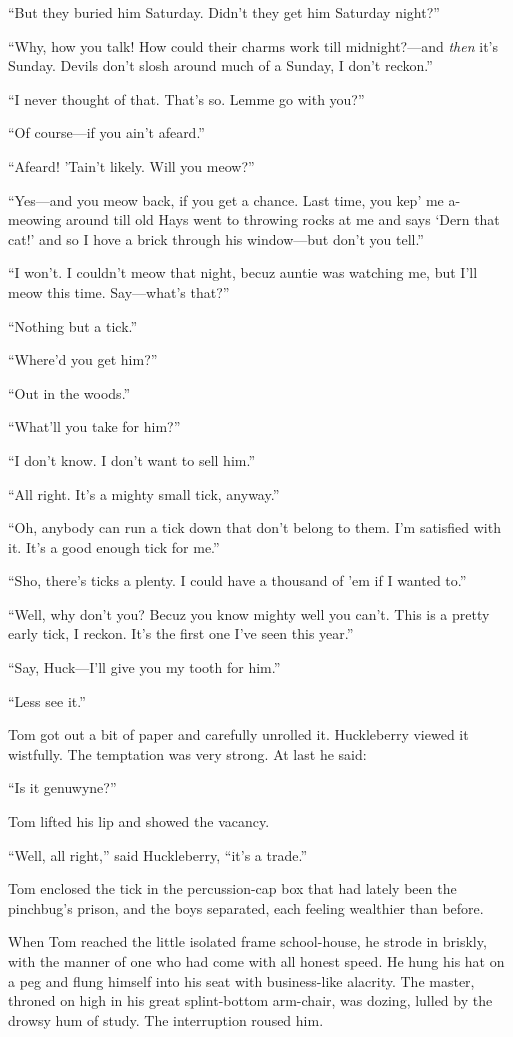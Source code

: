 \documentclass{book}
\begin{document}
“But they buried him Saturday. Didn’t they get him Saturday night?”

“Why, how you talk! How could their charms work till midnight?—and \emph{then} it’s Sunday. Devils don’t slosh around much of a Sunday, I don’t reckon.”

“I never thought of that. That’s so. Lemme go with you?”

“Of course—if you ain’t afeard.”

“Afeard! ’Tain’t likely. Will you meow?”

“Yes—and you meow back, if you get a chance. Last time, you kep’ me a-meowing around till old Hays went to throwing rocks at me and says ‘Dern that cat!’ and so I hove a brick through his window—but don’t you tell.”

“I won’t. I couldn’t meow that night, becuz auntie was watching me, but I’ll meow this time. Say—what’s that?”

“Nothing but a tick.”

“Where’d you get him?”

“Out in the woods.”

“What’ll you take for him?”

“I don’t know. I don’t want to sell him.”

“All right. It’s a mighty small tick, anyway.”

“Oh, anybody can run a tick down that don’t belong to them. I’m satisfied with it. It’s a good enough tick for me.”

“Sho, there’s ticks a plenty. I could have a thousand of ’em if I wanted to.”

“Well, why don’t you? Becuz you know mighty well you can’t. This is a pretty early tick, I reckon. It’s the first one I’ve seen this year.”

“Say, Huck—I’ll give you my tooth for him.”

“Less see it.”

Tom got out a bit of paper and carefully unrolled it. Huckleberry viewed it wistfully. The temptation was very strong. At last he said:

“Is it genuwyne?”

Tom lifted his lip and showed the vacancy.

“Well, all right,” said Huckleberry, “it’s a trade.”

Tom enclosed the tick in the percussion-cap box that had lately been the pinchbug’s prison, and the boys separated, each feeling wealthier than before.

When Tom reached the little isolated frame school-house, he strode in briskly, with the manner of one who had come with all honest speed. He hung his hat on a peg and flung himself into his seat with business-like alacrity. The master, throned on high in his great splint-bottom arm-chair, was dozing, lulled by the drowsy hum of study. The interruption roused him.
\end{document}
